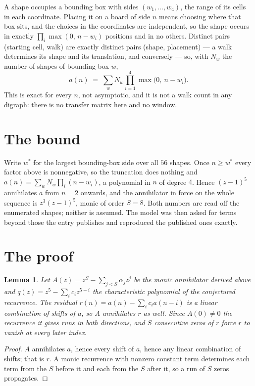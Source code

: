 \documentclass[11pt,a4paper]{article}
\theoremstyle{plain}
\newtheorem{lemma}[theorem]{Lemma}
\theoremstyle{definition}
\begin{document}
A shape occupies a bounding box with sides $(w_1,\dots,w_{4})$, the range of its cells in each
coordinate. Placing it on a board of side $n$ means choosing where that box sits, and the
choices in the coordinates are independent, so the shape occurs in exactly
$\prod_{i}\max(0,\,n-w_i)$ positions and in no others. Distinct pairs (starting cell,
walk) are exactly distinct pairs (shape, placement) --- a walk determines its shape and its
translation, and conversely --- so, with $N_w$ the number of shapes of bounding box $w$,
\[
a(n)\;=\;\sum_{w} N_w \prod_{i=1}^{4}\max\bigl(0,\ n-w_i\bigr).
\]
This is exact for every $n$, not asymptotic, and it is not a walk count in any digraph: there is
no transfer matrix here and no window.

\section{The bound}

Write $w^\ast$ for the largest bounding-box side over all $56$ shapes. Once $n\ge w^\ast$
every factor above is nonnegative, so the truncation does nothing and
$a(n)=\sum_w N_w\prod_i(n-w_i)$, a polynomial in $n$ of degree $4$. Hence $(z-1)^{5}$
annihilates $a$ from $n=2$ onwards, and the annihilator in force on the whole sequence is
$z^{3}(z-1)^{5}$, monic of order $S=8$. Both numbers are read off the enumerated
shapes; neither is assumed. The model was then asked for terms beyond those the entry publishes
and reproduced the published ones exactly.

\section{The proof}

\begin{lemma}\label{lem:crit}
Let $A(z)=z^S-\sum_{j<S}\alpha_jz^{j}$ be the monic annihilator derived above and
$q(z)=z^{5}-\sum_ic_iz^{5-i}$ the characteristic polynomial of the conjectured
recurrence. The residual $r(n)=a(n)-\sum_ic_ia(n-i)$ is a linear combination of shifts of $a$,
so $A$ annihilates $r$ as well. Since $A(0)\ne0$ the recurrence it gives runs in both
directions, and $S$ consecutive zeros of $r$ force $r$ to vanish at every later index.
\end{lemma}

\begin{proof}
$A$ annihilates $a$, hence every shift of $a$, hence any linear combination of shifts; that is
$r$. A monic recurrence with nonzero constant term determines each term from the $S$ before it
and each from the $S$ after it, so a run of $S$ zeros propagates.
\end{proof}
\end{document}
